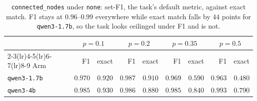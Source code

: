 \begin{table}[t]\centering\small
\begin{tabular}{lrrrrrrrr}
\toprule
& \multicolumn{2}{c}{$p{=}0.1$} & \multicolumn{2}{c}{$p{=}0.2$} & \multicolumn{2}{c}{$p{=}0.35$} & \multicolumn{2}{c}{$p{=}0.5$} \\
\cmidrule(lr){2-3}\cmidrule(lr){4-5}\cmidrule(lr){6-7}\cmidrule(lr){8-9}
Arm & F1 & exact & F1 & exact & F1 & exact & F1 & exact \\
\midrule
\texttt{qwen3-1.7b} & $0.970$ & $0.920$ & $0.987$ & $0.910$ & $0.969$ & $0.590$ & $0.963$ & $0.480$ \\
\texttt{qwen3-4b} & $0.985$ & $0.930$ & $0.986$ & $0.880$ & $0.985$ & $0.840$ & $0.993$ & $0.790$ \\
\bottomrule
\end{tabular}
\caption{\texttt{connected\_nodes} under \texttt{none}: set-F1, the task's default metric, against exact match. F1 stays at $0.96$--$0.99$ everywhere while exact match falls by $44$ points for \texttt{qwen3-1.7b}, so the task looks ceilinged under F1 and is not.}
\label{tab:cnmetric}
\end{table}
